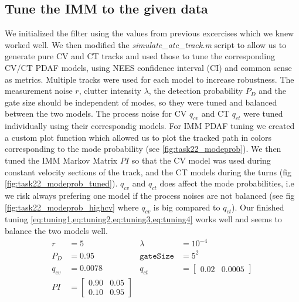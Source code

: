 \subsection{Tune the IMM to the given data}

We initialized the filter using the values from previous excercises which we knew worked well. We then modified the \textit{simulate\_atc\_track.m} script to allow us to generate pure CV and CT tracks and used those to tune the corresponding CV/CT PDAF models, using NEES confidence interval (CI) and common sense as metrics. Multiple tracks were used for each model to increase robustness. The measurement noise $r$, clutter intensity $\lambda$, the detection probability $P_D$ and the gate size should be independent of modes, so they were tuned and balanced between the two models. The process noise for CV $q_{cv}$ and CT $q_{ct}$ were tuned individually using their correspondig models. For IMM PDAF tuning we created a custom plot function which allowed us to plot the tracked path in colors corresponding to the mode probability (see \cref{fig:task22_modeprob}). We then tuned the IMM Markov Matrix $PI$ so that the CV model was used during constant velocity sections of the track, and the CT models during the turns (fig \ref{fig:task22_modeprob_tuned}). $q_{cv}$ and $q_{ct}$ does affect the mode probabilities, i.e we risk always prefering one model if the process noises are not balanced (see fig \ref{fig:task22_modeprob_highcv} where $q_{cv}$ is big compared to $q_{ct}$). Our finished tuning \cref{eq:tuning1,eq:tuning2,eq:tuning3,eq:tuning4} works well and seems to balance the two models well.
\begin{align}
        r &= 5 & \lambda &= 10^{-4} \label{eq:tuning1} \\ 
        P_D &= 0.95 & \texttt{gateSize} &= 5^2 \label{eq:tuning2} \\
        q_{cv} &= 0.0078  & q_{ct} &= \begin{bmatrix}0.02 & 0.0005\end{bmatrix} \label{eq:tuning3} \\
        PI &= \begin{bmatrix}0.90 & 0.05 \\ 0.10 & 0.95\end{bmatrix} \label{eq:tuning4}
\end{align}

